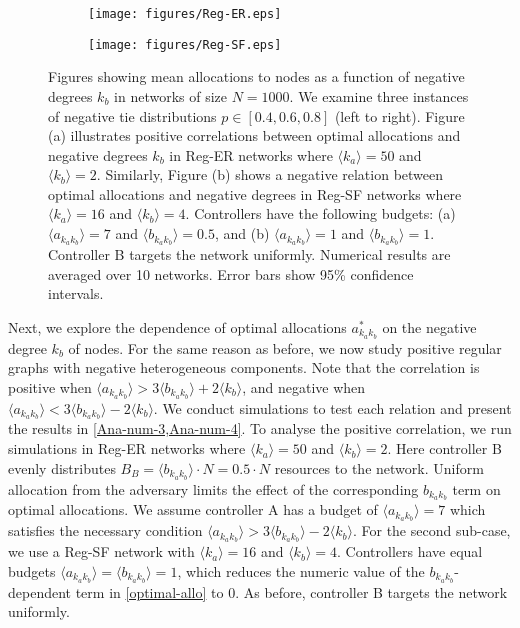 \begin{figure} 
  \begin{subfigure}[b]{\textwidth}
    \texttt{[image: figures/Reg-ER.eps]}
    \caption{}
    \label{Ana-num-3}
  \end{subfigure}

  \begin{subfigure}[b]{\textwidth}
    \texttt{[image: figures/Reg-SF.eps]}
    \caption{}
    \label{Ana-num-4}
  \end{subfigure}
  \caption{Figures showing mean allocations to nodes as a function of negative degrees $k_{b}$ in networks of size $N=1000$. We examine three instances of negative tie distributions $p \in [0.4,0.6,0.8]$ (left to right). Figure (a) illustrates positive correlations between optimal allocations and negative degrees $k_{b}$ in Reg-ER networks where $\langle k_{a} \rangle = 50$ and $\langle k_{b} \rangle = 2$. Similarly, Figure (b) shows a negative relation between optimal allocations and negative degrees in Reg-SF networks where $\langle k_{a} \rangle = 16$ and $\langle k_{b} \rangle = 4$.
  Controllers have the following budgets: (a) $\langle a_{k_{a}k_{b}} \rangle = 7$ and $\langle b_{k_{a}k_{b}} \rangle = 0.5$, and (b) $\langle a_{k_{a}k_{b}} \rangle = 1$ and $\langle b_{k_{a}k_{b}} \rangle = 1$. Controller B targets the network uniformly. Numerical results are averaged over 10 networks. Error bars show 95\% confidence intervals.}
  \label{Ana-num-kb}
\end{figure}


Next, we explore the dependence of optimal allocations $a_{k_{a}k_{b}}^*$ on the negative degree $k_{b}$ of nodes. For the same reason as before, we now study positive regular graphs with negative heterogeneous components. Note that the correlation is positive when $ \langle a_{k_{a}k_{b}} \rangle > 3 \langle b_{k_{a}k_{b}} \rangle + 2\langle k_{b} \rangle$, and negative when $\langle a_{k_{a}k_{b}} \rangle < 3 \langle b_{k_{a}k_{b}} \rangle  - 2\langle k_{b} \rangle $. We conduct simulations to test each relation and present the results in \cref{Ana-num-3,Ana-num-4}.
To analyse the positive correlation, we run simulations in Reg-ER networks where $\langle k_{a} \rangle =50$ and $\langle k_{b} \rangle =2$. Here controller B evenly distributes $B_{B} = \langle b_{k_{a}k_{b}} \rangle \cdot N = 0.5 \cdot N$ resources to the network. Uniform allocation from the adversary limits the effect of the corresponding $b_{k_{a}k_{b}}$ term on optimal allocations. We assume controller A has a budget of $\langle a_{k_{a}k_{b}} \rangle = 7$ which satisfies the necessary condition $\langle a_{k_{a}k_{b}} \rangle > 3 \langle b_{k_{a}k_{b}} \rangle  - 2\langle k_{b} \rangle $. 
For the second sub-case, we use a Reg-SF network with $\langle k_{a} \rangle =16$ and $\langle k_{b} \rangle =4$. Controllers have equal budgets $\langle a_{k_{a}k_{b}} \rangle = \langle b_{k_{a}k_{b}} \rangle =1$, which reduces the numeric value of the $b_{k_{a}k_{b}}$-dependent term in \cref{optimal-allo} to $0$. As before, controller B targets the network uniformly. 

